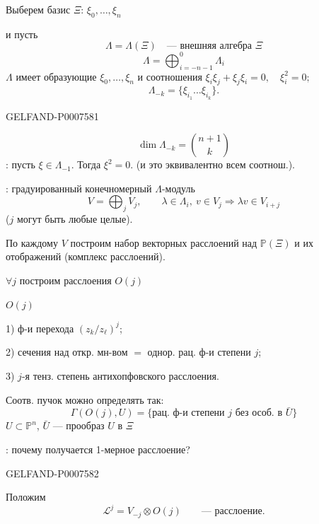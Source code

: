 Выберем базис \(\Xi\): \(\xi_0,\ldots,\xi_n\)

и пусть
\[
\Lambda=\Lambda(\Xi)\quad\text{--- внешняя алгебра }\Xi
\]
\[
\Lambda=\bigoplus_{i=-n-1}^{0}\Lambda_i
\]
\(\Lambda\) имеет образующие \(\xi_0,\ldots,\xi_n\) и соотношения
\(\xi_i\xi_j+\xi_j\xi_i=0,\quad\xi_i^2=0;\)
\[
\Lambda_{-k}=\{\xi_{i_1}\ldots\xi_{i_k}\}.
\]


\begin{GelfandAdjacentEvidence}{GELFAND-P000758}{1}

\[
\dim\Lambda_{-k}=\binom{n+1}{k}
\]
: пусть \(\xi\in\Lambda_{-1}\).
Тогда \(\xi^2=0\).
(и это эквивалентно всем соотнош.).

: градуированный конечномерный \(\Lambda\)-модуль
\[
V=\bigoplus_j V_j,\qquad
\lambda\in\Lambda_i,\ v\in V_j\Rightarrow\lambda v\in V_{i+j}
\]
(\(j\) могут быть любые целые).

По каждому \(V\) построим набор векторных расслоений над \(\mathbb P(\Xi)\)
и их отображений (комплекс расслоений).

\(\forall j\) построим расслоения \(O(j)\)

 \(O(j)\)

1) ф-и перехода \((z_k/z_\ell)^j\);

2) сечения над откр. мн-вом \(=\) однор. рац. ф-и степени \(j\);

3) \(j\)-я тенз. степень антихопфовского расслоения.

Соотв. пучок можно определять так:
\[
\Gamma(O(j),U)=
\{\text{рац. ф-и степени }j\text{ без особ. в }\bar U\}
\]
\(U\subset\mathbb P^n\), \(\bar U\) --- прообраз \(U\) в \(\Xi\)

: почему получается 1-мерное расслоение?

\end{GelfandAdjacentEvidence}
\begin{GelfandAdjacentEvidence}{GELFAND-P000758}{2}


Положим
\[
\mathcal L^j=V_{-j}\otimes O(j)\qquad\text{--- расслоение.}
\]
\end{GelfandAdjacentEvidence}
